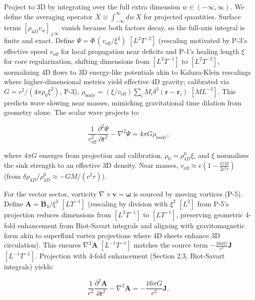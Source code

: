 Project to 3D by integrating over the full extra dimension $w \in (-\infty, \infty)$. We define the averaging operator $\overline{X} \equiv \int_{-\infty}^{\infty} dw \, X$ for projected quantities. Surface terms $[\rho_{4D} v_w]_{\pm \infty}$ vanish because both factors decay, so the full-axis integral is finite and exact. Define $\Psi = \overline{\Phi} \, (v_{\text{eff}} / \xi^2)$ $[L^2 T^{-2}]$ (rescaling motivated by P-3's effective speed $v_{\text{eff}}$ for local propagation near deficits and P-1's healing length $\xi$ for core regularization, shifting dimensions from $[L^2 T^{-1}]$ to $[L^2 T^{-2}]$, normalizing 4D flows to 3D energy-like potentials akin to Kaluza-Klein rescalings where higher-dimensional metrics yield effective 4D gravity; calibrated via $G = c^2 / (4\pi \rho_0 \xi^2)$, P-3), $\rho_{\text{body}} = \left( \xi / v_{\text{eff}} \right) \sum_i \dot{M}_i \delta^3(\mathbf{r} - \mathbf{r}_i)$ $[M L^{-3}]$. This predicts wave slowing near masses, mimicking gravitational time dilation from geometry alone. The scalar wave projects to:

\begin{equation}
\frac{1}{v_{\text{eff}}^2} \frac{\partial^2 \Psi}{\partial t^2} - \nabla^2 \Psi = 4\pi G \rho_{\text{body}},
\end{equation}

where $4\pi G$ emerges from projection and calibration, $\rho_0 = \rho_{4D}^0 \xi$, and $\xi$ normalizes the sink strength to an effective 3D density. Near masses, $v_{\text{eff}} \approx c \left(1 - \frac{G M}{2 c^2 r}\right)$ (from $\delta \rho_{4D} / \rho_{4D}^0 \approx - G M / (c^2 r)$).

For the vector sector, vorticity $\nabla \times \mathbf{v} = \boldsymbol{\omega}$ is sourced by moving vortices (P-5). Define $\mathbf{A} = \overline{\mathbf{B}_4} / \xi^2$ $[L T^{-1}]$ (rescaling by division with $\xi^2$ $[L^2]$ from P-5's projection reduces dimensions from $[L^2 T^{-1}]$ to $[L T^{-1}]$, preserving geometric 4-fold enhancement from Biot-Savart integrals and aligning with gravitomagnetic form akin to superfluid vortex projections where 4D sheets enhance 3D circulation). This ensures $\nabla^2 \mathbf{A}$ $[L^{-1} T^{-1}]$ matches the source term $-\frac{16\pi G}{c^2} \mathbf{J}$ $[L^{-1} T^{-1}]$. Projection with 4-fold enhancement (Section 2.3, Biot-Savart integrals) yields:

\begin{equation}
\frac{1}{c^2} \frac{\partial^2 \mathbf{A}}{\partial t^2} - \nabla^2 \mathbf{A} = -\frac{16\pi G}{c^2} \mathbf{J},
\end{equation}

